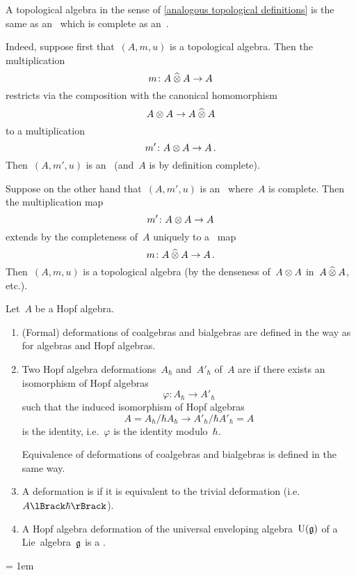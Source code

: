 \documentclass[a4paper, 11pt, oneside]{scrartcl}
\begin{document}
\begin{remark}
  A topological algebra in the sense of \cref{analogous topological definitions} is the same as an~\algebra{$\kfhbar$} which is complete as an~\module{$\kfhbar$}.

  Indeed, suppose first that~$(A, m, u)$ is a topological algebra.
  Then the multiplication
  \[
    m \colon A \mathbin{\widehat{\otimes}} A \to A
  \]
  restricts via the composition with the canonical homomorphism
  \[
    A \otimes A
    \to
    A \mathbin{\widehat{\otimes}} A
  \]
  to a multiplication
  \[
    m'
    \colon
    A \otimes A
    \to
    A \,.
  \]
  Then~$(A, m', u)$ is an~\algebra{$\kfhbar$} (and~$A$ is by definition complete).

  Suppose on the other hand that~$(A, m', u)$ is an~\algebra{$\kfhbar$} where~$A$ is complete.
  Then the multiplication map
  \[
    m'
    \colon
    A \otimes A
    \to
    A
  \]
  extends by the completeness of~$A$ uniquely to a~\linear{$\kfhbar$} map
  \[
    m
    \colon
    A \mathbin{\widehat{\otimes}} A
    \to
    A \,.
  \]
  Then~$(A, m, u)$ is a topological algebra (by the denseness of~$A \otimes A$ in~$A \mathbin{\widehat{\otimes}} A$, etc.).
\end{remark}

\begin{definition}
  Let~$A$ be a Hopf algebra.
  \begin{enumerate}
    \item
      (Formal) deformations of coalgebras and bialgebras are defined in the way as for algebras and Hopf algebras.
    \item
      Two Hopf algebra deformations~$A_\hbar$ and~$A'_\hbar$ of~$A$ are  if there exists an isomorphism of Hopf algebras
      \[
        \varphi
        \colon
        A_\hbar
        \to
        A'_\hbar
      \]
      such that the induced isomorphism of Hopf algebras
      \[
        A
        =
        A_\hbar / \hbar A_\hbar
        \to
        A'_\hbar / \hbar A'_\hbar
        = A
      \]
      is the identity, i.e.~$\varphi$ is the identity modulo~$\hbar$.

      Equivalence of deformations of coalgebras and bialgebras is defined in the same way.
    \item
      A deformation is  if it is equivalent to the trivial deformation (i.e.~$\power{A}{\hbar}$).
    \item
      A Hopf algebra deformation of the universal enveloping algebra~$\operatorname{U}(\mathfrak{g})$ of a Lie~algebra~$\mathfrak{g}$ is a .
  \end{enumerate}
\end{definition}



\emergencystretch = 1em
\printbibliography
\end{document}
